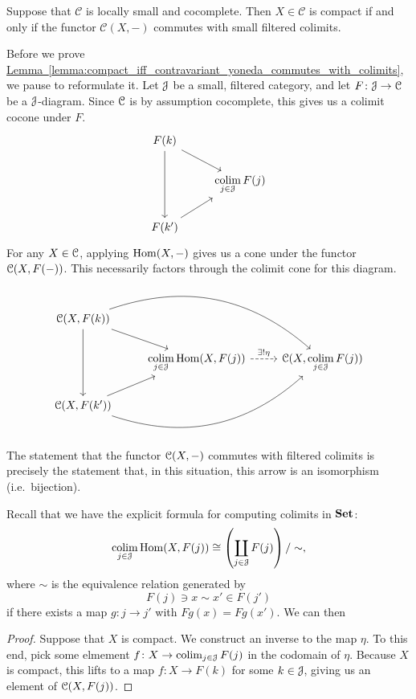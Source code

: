 \documentclass[main.tex]{subfiles}
\begin{document}
\begin{lemma}
  \label{lemma:compact_iff_contravariant_yoneda_commutes_with_colimits}
  Suppose that $\mathcal{C}$ is locally small and cocomplete. Then $X \in \mathcal{C}$ is compact if and only if the functor $\mathcal{C}(X, -)$ commutes with small filtered colimits.
\end{lemma}
Before we prove \hyperref[lemma:compact_iff_contravariant_yoneda_commutes_with_colimits]{Lemma~\ref*{lemma:compact_iff_contravariant_yoneda_commutes_with_colimits}}, we pause to reformulate it. Let $\mathcal{J}$ be a small, filtered category, and let $F\colon \mathcal{J} \to \mathcal{C}$ be a $\mathcal{J}$-diagram. Since $\mathcal{C}$ is by assumption cocomplete, this gives us a colimit cocone under $F$.
\begin{equation*}
  \begin{tikzcd}
    F(k)
    \arrow[dr]
    \arrow[dd]
    \\
    & \colim\limits_{j \in \category{J}} F(j)
    \\
    F(k')
    \arrow[ur]
  \end{tikzcd}
\end{equation*}
For any $X \in \mathcal{C}$, applying $\operatorname{Hom}(X, -)$ gives us a cone under the functor $\mathcal{C}(X, F(-))$. This necessarily factors through the colimit cone for this diagram.
\begin{equation*}
  \begin{tikzcd}
    \category{C}(X, F(k))
    \arrow[dr]
    \arrow[dd]
    \arrow[drr, bend left]
    \\
    & \colim\limits_{j \in \category{J}} \Hom(X, F(j))
    \arrow[r, dashed, "\exists! \eta"]
    & \category{C}(X, \colim\limits_{j \in \category{J}} F(j))
    \\
    \category{C}(X, F(k'))
    \arrow[ur]
    \arrow[urr, bend right]
  \end{tikzcd}
\end{equation*}
The statement that the functor $\mathcal{C}(X, -)$ commutes with filtered colimits is precisely the statement that, in this situation, this arrow is an isomorphism (i.e.\ bijection).

Recall that we have the explicit formula for computing colimits in $\mathbf{Set}$:
\begin{equation*}
  \operatorname*{colim}_{j \in \mathcal{J}} \operatorname{Hom}(X, F(j)) \cong \left( \coprod_{j \in \mathcal{J}} F(j) \right) / \sim,
\end{equation*}
where $\sim$ is the equivalence relation generated by
\begin{equation*}
  F(j) \ni x \sim x' \in F(j')
\end{equation*}
if there exists a map $g\colon j \to j'$ with $Fg(x) = Fg(x')$. We can then
\begin{proof}
  Suppose that $X$ is compact. We construct an inverse to the map $\eta$. To this end, pick some elmement $f\colon X \to \operatorname*{colim}_{j \in \mathcal{J}} F(j)$ in the codomain of $\eta$. Because $X$ is compact, this lifts to a map $f\colon X \to F(k)$ for some $k \in \mathcal{J}$, giving us an element of $\mathcal{C}(X, F(j))$.

\end{proof}
\end{document}
